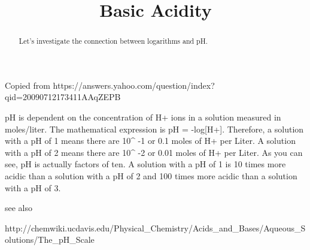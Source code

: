 \documentclass{ximera}
\title{Basic Acidity}
\begin{document}
\begin{abstract}
Let's investigate the connection between logarithms and pH.
\end{abstract}
\maketitle

Copied from https://answers.yahoo.com/question/index?qid=20090712173411AAqZEPB

pH is dependent on the concentration of H+ ions in a solution measured in moles/liter. The mathematical expression is pH = -log[H+]. Therefore, a solution with a pH of 1 means there are 10^ -1 or 0.1 moles of H+ per Liter. A solution with a pH of 2 means there are 10^ -2 or 0.01 moles of H+ per Liter. As you can see, pH is actually factors of ten. A solution with a pH of 1 is 10 times more acidic than a solution with a pH of 2 and 100 times more acidic than a solution with a pH of 3.

see also 

http://chemwiki.ucdavis.edu/Physical_Chemistry/Acids_and_Bases/Aqueous_Solutions/The_pH_Scale
\end{document}
